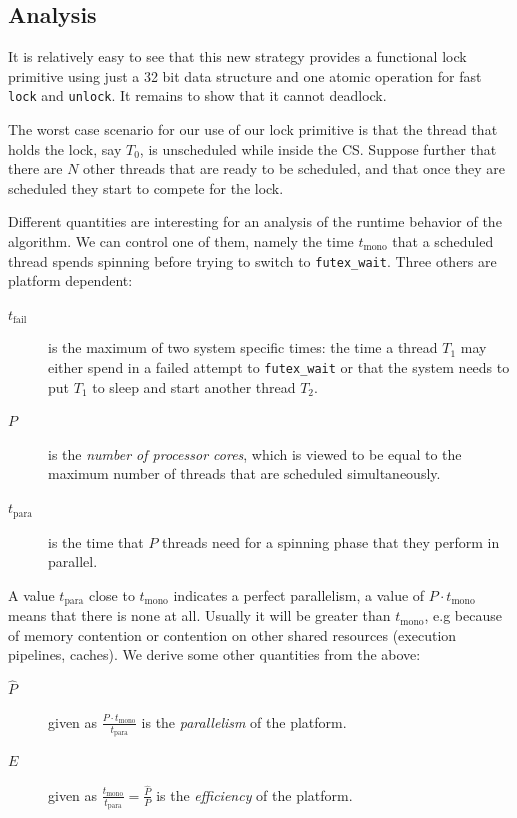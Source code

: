 \subsection{Analysis}
\label{sec-3-2}

It is relatively easy to see that this new strategy provides a
functional lock primitive using just a 32 bit data structure and
one atomic operation for fast \texttt{lock} and \texttt{unlock}. It remains to
show that it cannot deadlock.

The worst case scenario for our use of our lock primitive is that
the thread that holds the lock, say $T_0$, is unscheduled while
inside the CS. Suppose further that there are $N$ other threads
that are ready to be scheduled, and that once they are scheduled
they start to compete for the lock.

Different quantities are interesting for an analysis of the runtime
behavior of the algorithm. We can control one of them, namely the
time $t_{\textrm{mono}}$ that a scheduled thread spends spinning
before trying to switch to \texttt{futex\_wait}.  Three others are platform
dependent:\itemadjust

\begin{description}
\item[{$t_{\textrm{fail}}$}] is the maximum of two system specific
times: the time a thread $T_1$ may either spend in a failed
attempt to \texttt{futex\_wait} or that the system needs to put $T_1$
to sleep and start another thread $T_2$.\itemadjust

\item[{$P$}] is the \emph{number of processor cores}, which is viewed to be
equal to the maximum number of threads that are scheduled
simultaneously.\itemadjust

\item[{$t_{\textrm{para}}$}] is the time that $P$ threads need for a
spinning phase that they perform in parallel.\itemadjust
\end{description}

A value $t_{\textrm{para}}$ close to $t_{\textrm{mono}}$ indicates
a perfect parallelism, a value of $P \cdot t_{\textrm{mono}}$
means that there is none at all. Usually it will be greater than
$t_{\textrm{mono}}$, e.g because of memory contention or
contention on other shared resources (execution pipelines,
caches). We derive some other quantities from the
above:\itemadjust

\begin{description}
\item[{$\widehat{P}$}] given as $\frac{P\cdot
                       t_{\textrm{mono}}}{t_{\textrm{para}}}$ is the
\emph{parallelism} of the platform.

\item[{$E$}] given as $\frac{t_\textrm{mono}}{t_{\textrm{para}}} =
             \frac{\widehat{P}}{P}$ is the \emph{efficiency} of the
platform.
\end{description}

